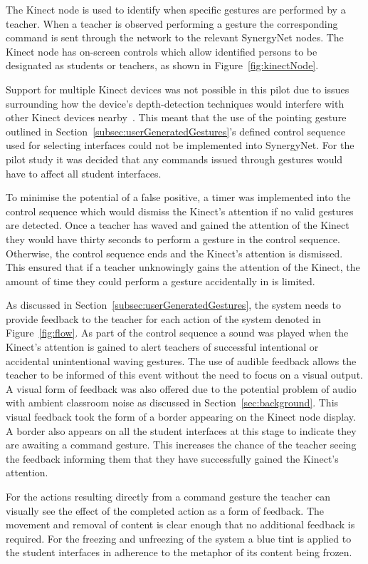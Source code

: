 \documentclass[link]{IWCOMP}
\begin{document}
The Kinect node is used to identify when specific gestures are performed by a teacher.
When a teacher is observed performing a gesture the corresponding command is sent through the network to the relevant SynergyNet nodes.
The Kinect node has on-screen controls which allow identified persons to be designated as students or teachers, as shown in Figure~\ref{fig:kinectNode}.

Support for multiple Kinect devices was not possible in this pilot due to issues surrounding how the device's depth-detection techniques would interfere with other Kinect devices nearby~\citep{Maimone2012,Schroder2011}.
This meant that the use of the pointing gesture outlined in Section~\ref{subsec:userGeneratedGestures}'s defined control sequence used for selecting interfaces could not be implemented into SynergyNet.
For the pilot study it was decided that any commands issued through gestures would have to affect all student interfaces.

To minimise the potential of a false positive, a timer was implemented into the control sequence which would dismiss the Kinect's attention if no valid gestures are detected.
Once a teacher has waved and gained the attention of the Kinect they would have thirty seconds to perform a gesture in the control sequence.
Otherwise, the control sequence ends and the Kinect's attention is dismissed.
This ensured that if a teacher unknowingly gains the attention of the Kinect, the amount of time they could perform a gesture accidentally in is limited.

As discussed in Section~\ref{subsec:userGeneratedGestures}, the system needs to provide feedback to the teacher for each action of the system denoted in Figure~\ref{fig:flow}.
As part of the control sequence a sound was played when the Kinect's attention is gained to alert teachers of successful intentional or accidental unintentional waving gestures.
The use of audible feedback allows the teacher to be informed of this event without the need to focus on a visual output.
A visual form of feedback was also offered due to the potential problem of audio with ambient classroom noise as discussed in Section~\ref{sec:background}.
This visual feedback took the form of a border appearing on the Kinect node display.
A border also appears on all the student interfaces at this stage to indicate they are awaiting a command gesture.
This increases the chance of the teacher seeing the feedback informing them that they have successfully gained the Kinect's attention.

For the actions resulting directly from a command gesture the teacher can visually see the effect of the completed action as a form of feedback.
The movement and removal of content is clear enough that no additional feedback is required.
For the freezing and unfreezing of the system a blue tint is applied to the student interfaces in adherence to the metaphor of its content being frozen.
\end{document}

